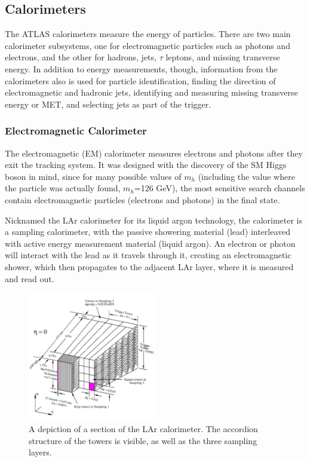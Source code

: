  


\subsection{Calorimeters}
The ATLAS calorimeters measure the energy of particles.  There are two main calorimeter
subsystems, one for electromagnetic particles such as photons and electrons, 
and the other for hadrons, jets, $\tau$ leptons, and missing transverse energy.
In addition to energy measurements, though, information from the calorimeters also is used
for particle identification, finding the direction of electromagnetic and hadronic jets, 
identifying and measuring missing transverse energy or MET, and selecting jets as part of the
trigger.



\subsubsection{Electromagnetic Calorimeter}
\label{sec:em_cal}

The electromagnetic (EM) calorimeter measures electrons and photons after they exit the tracking system. It was
designed with the discovery of the SM Higgs boson in mind, since for many possible values of $m_h$ (including 
the value where the particle was actually found, $m_h$=126 GeV), the most sensitive search channels contain 
electromagnetic particles (electrons and photons) in the final state. 

Nicknamed the LAr 
calorimeter for its liquid argon technology,  the calorimeter is a sampling calorimeter, with the passive showering material 
(lead) interleaved with active energy measurement material (liquid argon).  An electron or photon will interact with the 
lead as it travels through it, creating an electromagnetic shower, which then propagates to the adjacent LAr layer, 
where it is measured and read out.


\begin{figure}
\begin{center}
	\includegraphics[width=0.5\textwidth]{ATLASDetector/images/LArg_accordion.pdf}	
	\caption{A depiction of a section of the LAr calorimeter.  The accordion structure of the towers is visible, as well as the three sampling layers. 	\label{fig:lar}}
\end{center}
\end{figure}


